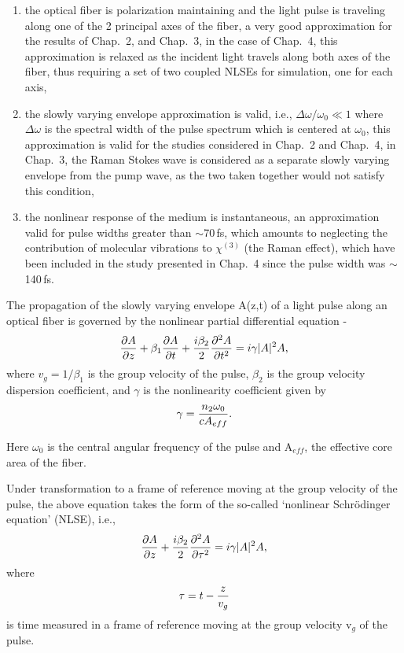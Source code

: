 \begin{enumerate}
\item[(j)] the optical fiber is polarization maintaining and the light
pulse is traveling along one of the 2 principal axes of the fiber, a very good approximation for the results of Chap.\ 2, and Chap.\ 3, in the case of Chap.\ 4, this approximation is relaxed as the incident light travels along both axes of the fiber, thus requiring a set of two coupled NLSEs for simulation, one for each axis,
\item[(k)] the slowly varying envelope approximation is valid, i.e.,
$\Delta\omega/\omega_{0} \ll 1$ where $\Delta \omega$ is the spectral
width of the pulse spectrum which is centered at $\omega_{0}$, this approximation is valid for the studies considered in Chap.\ 2 and Chap.\ 4, in Chap.\ 3, the Raman Stokes wave is considered as a separate slowly varying envelope from the pump wave, as the two taken together would not satisfy this condition,
\item[(l)] the nonlinear response of the medium is instantaneous, an
approximation valid for pulse widths greater than $\sim$70\,fs, which amounts to neglecting the contribution of molecular vibrations to $\chi^{(3)}$ (the Raman effect), which have been included in the study presented in Chap.\ 4 since the pulse width was $\sim$ 140\,fs.
\end{enumerate}
The propagation of the slowly varying envelope A(z,t) of a light
pulse
along an optical fiber is governed by the nonlinear partial
differential equation \cite{Agrawal2} -
\begin{equation}
{\partial A \over \partial z} + \beta_{1} {\partial A \over \partial t} + {i \beta_{2} \over 2} {\partial^{2} A \over \partial t^{2}} = i \gamma |A|^{2}A,
\end{equation}
where $v_{g}=1/\beta_{1}$ is the group velocity of the pulse,
$\beta_{2}$
is the group velocity dispersion coefficient, %
and $\gamma$ is the nonlinearity coefficient given by
\begin{equation}
\gamma = {n_{2}\omega_{0} \over c A_{eff}} .
\end{equation}

Here $\omega_{0}$ is the central angular frequency of the pulse and
A$_{eff}$, the effective core area of the fiber.

Under transformation to  a frame of reference moving at the group
velocity of the pulse, the above equation takes the form of the so-called
`nonlinear Schr\"odinger equation' (NLSE), i.e.,
\begin{equation}
{\partial A \over \partial z} + {i\beta_2 \over 2} {\partial^2
A \over \partial \tau^2} = i \gamma |A|^2A ,
\end{equation}
where
\begin{equation}
\tau = t - {z \over v_g}
\end{equation}
is time measured in a frame of reference moving at the group
velocity
v$_g$ of the pulse.

